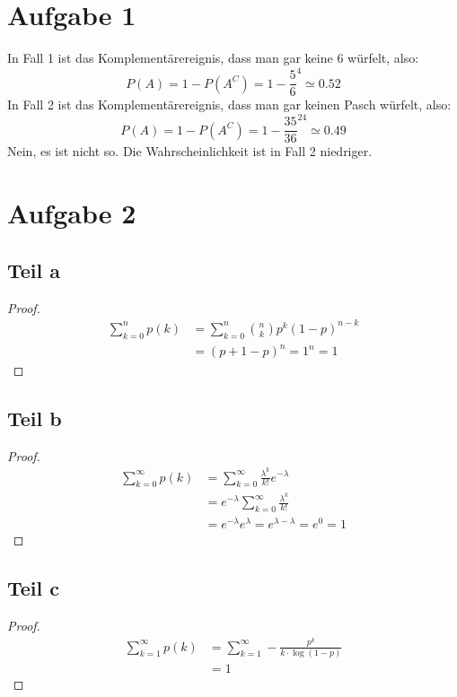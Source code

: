 \documentclass[10pt,a4paper]{article}
\begin{document}
\section{Aufgabe 1}
In Fall 1 ist das Komplementärereignis, dass man gar keine 6 würfelt, also:
\begin{equation}
  P(A) = 1 - P(A^{C}) = 1 - \frac{5}{6}^{4} \simeq 0.52
\end{equation}
In Fall 2 ist das Komplementärereignis, dass man gar keinen Pasch würfelt, also:
\begin{equation}
  P(A) = 1 - P(A^{C}) = 1 - \frac{35}{36}^{24} \simeq 0.49
\end{equation}
Nein, es ist nicht so.
Die Wahrscheinlichkeit ist in Fall 2 niedriger.

\section{Aufgabe 2}

\subsection{Teil a}
\begin{proof}
  \begin{align*}
    \sum_{k = 0}^{n} p(k) & = \sum_{k = 0}^{n} \binom{n}{k} p^{k} (1 - p)^{n - k}\\
    & = (p + 1 - p)^{n} = 1^{n} = 1
  \end{align*}
\end{proof}

\subsection{Teil b}
\begin{proof}
  \begin{align*}
    \sum_{k = 0}^{\infty} p(k) & = \sum_{k = 0}^{\infty} \frac{\lambda^{k}}{k!} e^{-\lambda}\\
    & = e^{-\lambda} \sum_{k = 0}^{\infty} \frac{\lambda^{k}}{k!}\\
    & = e^{-\lambda} e^{\lambda} = e^{\lambda - \lambda} = e^{0} = 1
  \end{align*}
\end{proof}

\subsection{Teil c}
\begin{proof}
  \begin{align*}
    \sum_{k = 1}^{\infty} p(k) & = \sum_{k = 1}^{\infty} -\frac{p^{k}}{k \cdot \log(1 - p)} \\
    & = 1
  \end{align*}
\end{proof}
\end{document}

